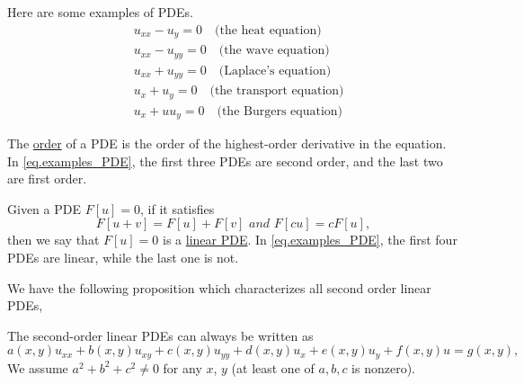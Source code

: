 \begin{example}
    Here are some examples of PDEs.
    \begin{equation}\label{eq.examples_PDE}
        \begin{split}
            &u_{x x}-u_y=0 \quad \text{(the heat equation)}
            \\
            &u_{x x}-u_{y y}=0 \quad \text{(the wave equation)}
            \\
            &u_{x x}+u_{y y}=0 \quad \text{(Laplace's equation)}
            \\
            &u_{x}+u_{y}=0 \quad \text{(the transport equation)}
            \\
            &u_{x}+uu_{y}=0 \quad \text{(the Burgers equation)}
        \end{split}
    \end{equation}
\end{example}

\begin{definition}
    The \underline{order} of a PDE is the order of the highest-order derivative in the equation.
    In \eqref{eq.examples_PDE}, the first three PDEs are second order, and the last two are first order.
\end{definition}

\begin{definition}
    Given a PDE $F[u] = 0$, if it satisfies 
    \begin{equation}\label{eq.linear_pde_def}
        F[u+v] = F[u] + F[v]\textit{ and }F[cu] = cF[u],
    \end{equation}
    then we say that $F[u] = 0$ is a \underline{linear PDE}. In \eqref{eq.examples_PDE}, the first four PDEs are linear, while the last one is not.
\end{definition}

We have the following proposition which characterizes all second order linear PDEs,

\begin{proposition}[]
The second-order linear PDEs can always be written as
\begin{equation}\label{eq.2nd_order_linear}
    a(x, y) u_{x x}+b(x, y) u_{x y}+c(x, y) u_{y y}+d(x, y) u_x+e(x, y) u_y+f(x, y) u=g(x, y),
\end{equation}
We assume $a^2+b^2+c^2 \neq 0$ for any $x$, $y$ (at least one of $a, b, c$ is nonzero). 
\end{proposition}

